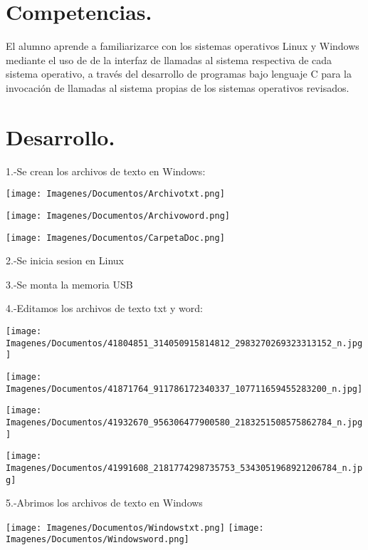 \documentclass[12pt]{article}
\begin{document}
\section{Competencias.}

El alumno aprende a familiarizarce con los sistemas operativos Linux y Windows mediante el uso de de la interfaz de llamadas al sistema respectiva de cada sistema operativo, a través del desarrollo de programas bajo lenguaje C para la invocación de llamadas al sistema propias de los sistemas operativos revisados.
\section{Desarrollo.}

     1.-Se crean los archivos de texto en Windows:
     \begin{center}
         \texttt{[image: Imagenes/Documentos/Archivotxt.png]}
     
        \texttt{[image: Imagenes/Documentos/Archivoword.png]}
     
        \texttt{[image: Imagenes/Documentos/CarpetaDoc.png]}
     \end{center}
    2.-Se inicia sesion en Linux
    
    3.-Se monta la memoria USB
    
    4.-Editamos los archivos de texto txt y word:
    \begin{center}
        \texttt{[image: Imagenes/Documentos/41804851\_314050915814812\_2983270269323313152\_n.jpg]}
    
        \texttt{[image: Imagenes/Documentos/41871764\_911786172340337\_107711659455283200\_n.jpg]}
    
        \texttt{[image: Imagenes/Documentos/41932670\_956306477900580\_2183251508575862784\_n.jpg]}
    
        \texttt{[image: Imagenes/Documentos/41991608\_2181774298735753\_5343051968921206784\_n.jpg]}
    
    \end{center}
    
    5.-Abrimos los archivos de texto en Windows
    \begin{center}
        \texttt{[image: Imagenes/Documentos/Windowstxt.png]}
        \texttt{[image: Imagenes/Documentos/Windowsword.png]}
    \end{center}
    
\end{document}
